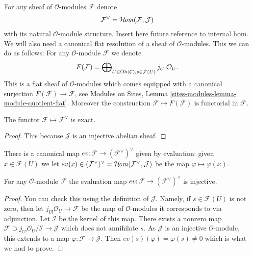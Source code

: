 \medskip\noindent
For any sheaf of $\mathcal{O}$-modules $\mathcal{F}$ denote
$$
\mathcal{F}^\vee
=
\mathop{\mathcal{H}\!\mathit{om}}\nolimits(\mathcal{F}, \mathcal{J})
$$
with its natural $\mathcal{O}$-module structure.
Insert here future reference to internal hom.
We will also need
a canonical flat resolution of a sheaf of $\mathcal{O}$-modules.
This we can do as follows: For any $\mathcal{O}$-module
$\mathcal{F}$ we denote
$$
F(\mathcal{F})
=
\bigoplus\nolimits_{U \in \mathop{\mathrm{Ob}}\nolimits(\mathcal{C}), s \in \mathcal{F}(U)}
j_{U!}\mathcal{O}_U.
$$
This is a flat sheaf of $\mathcal{O}$-modules which comes equipped
with a canonical surjection $F(\mathcal{F}) \to \mathcal{F}$, see
Modules on Sites, Lemma \ref{sites-modules-lemma-module-quotient-flat}.
Moreover the construction $\mathcal{F} \mapsto F(\mathcal{F})$
is functorial in $\mathcal{F}$.

\begin{lemma}
\label{lemma-vee-exact-sheaves}
The functor $\mathcal{F} \mapsto \mathcal{F}^\vee$ is exact.
\end{lemma}

\begin{proof}
This because $\mathcal{J}$ is an injective abelian sheaf.
\end{proof}

\noindent
There is a canonical map $ev : \mathcal{F} \to (\mathcal{F}^\vee)^\vee$
given by evaluation: given $x \in \mathcal{F}(U)$ we let
$ev(x) \in (\mathcal{F}^\vee)^\vee =
\mathop{\mathcal{H}\!\mathit{om}}\nolimits(\mathcal{F}^\vee, \mathcal{J})$
be the map $\varphi \mapsto \varphi(x)$.

\begin{lemma}
\label{lemma-ev-injective-sheaves}
For any $\mathcal{O}$-module $\mathcal{F}$ the evaluation map
$ev : \mathcal{F} \to (\mathcal{F}^\vee)^\vee$ is injective.
\end{lemma}

\begin{proof}
You can check this using the definition of $\mathcal{J}$.
Namely, if $s \in \mathcal{F}(U)$ is not zero, then let
$j_{U!}\mathcal{O}_U \to \mathcal{F}$ be the map of
$\mathcal{O}$-modules it corresponds to via adjunction.
Let $\mathcal{I}$ be the kernel of this map. There exists
a nonzero map $\mathcal{F} \supset j_{U!}\mathcal{O}_U/\mathcal{I}
\to \mathcal{J}$ which does not annihilate $s$. As $\mathcal{J}$ is
an injective $\mathcal{O}$-module, this extends to a map
$\varphi : \mathcal{F} \to \mathcal{J}$.
Then $ev(s)(\varphi) = \varphi(s) \not = 0$ which is what we had to prove.
\end{proof}

